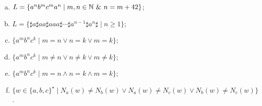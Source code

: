 \begin{problem}
\begin{enumerate}[a)]
  \item
    $L = \{a^nb^mc^ma^n \mid m,n\in\Nat\ \&\ n = m+42\}$;
  \item
    $L = \{\sharp a \sharp aa \sharp aaa \sharp \cdots \sharp a^{n-1}\sharp a^n\sharp \mid n \geq 1\}$;
  \item
    $\{a^mb^nc^k\mid m = n \vee n = k \vee m = k\}$;
  \item
    $\{a^mb^nc^k\mid m \neq n \vee n \neq k \vee m \neq k\}$;
  \item
    $\{a^mb^nc^k\mid m = n \wedge n = k \wedge m = k\}$;
  \item
    $\{w \in \{a,b,c\}^\star\mid N_a(w) \neq N_b(w) \vee N_a(w) \neq N_c(w) \vee N_b(w) \neq N_c(w)\}$.
  \end{enumerate}
\end{problem}



